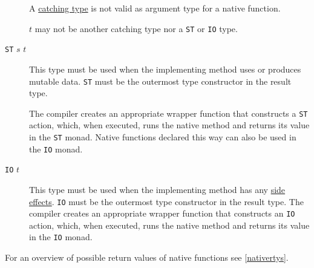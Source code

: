 \begin{description}
A \hyperref[catching]{catching type} is not valid as argument type for a native function. 

$t$ may not be another catching type nor a \texttt{ST} or \texttt{IO} type.

\item[\texttt{ST} $s$ $t$] This type must be used when the implementing method uses or produces mutable data. 
\texttt{ST} must be the outermost type constructor in the result type. 

The compiler creates an appropriate wrapper function that constructs a \texttt{ST}  action, which, when executed, runs the native method and returns its value in the \texttt{ST} monad. Native functions declared this way can also be used in the \texttt{IO} monad.

\item[\texttt{IO} $t$] This type must be used when the implementing method has any \hyperref[pure]{side effects}. \texttt{IO} must be the outermost type constructor in the result type. 
The compiler creates an appropriate wrapper function that constructs an \texttt{IO}  action, which, when executed, runs the native method and returns its value in the \texttt{IO} monad.

\end{description}

For an overview of possible return values of native functions see \autoref{nativertys}.

